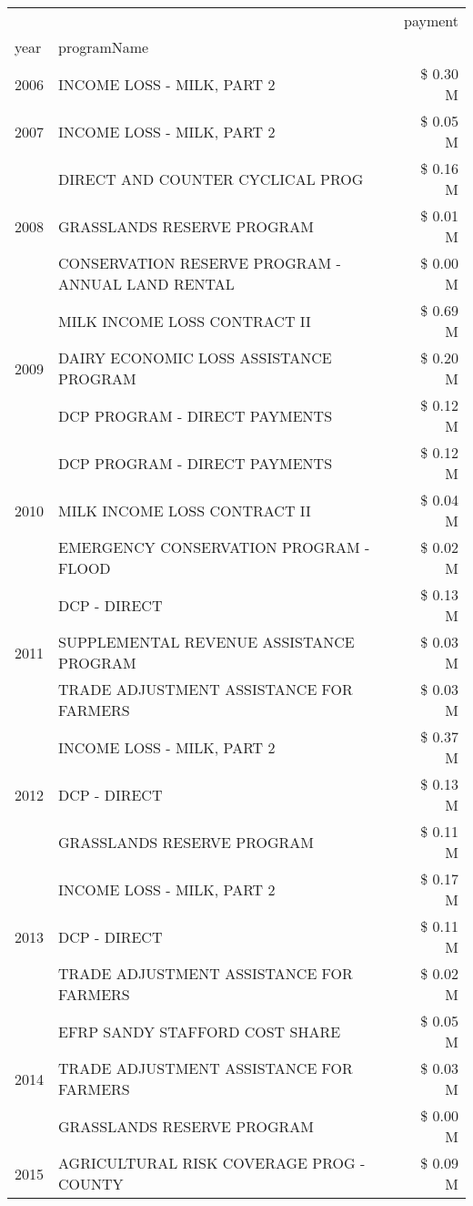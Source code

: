 \begin{tabular}{llr}
\toprule
 &  & payment \\
year & programName &  \\
\midrule
2006 & INCOME LOSS - MILK, PART 2 & \$ 0.30 M \\
\cline{1-3}
2007 & INCOME LOSS - MILK, PART 2 & \$ 0.05 M \\
\cline{1-3}
\multirow[t]{3}{*}{2008} & DIRECT AND COUNTER CYCLICAL PROG & \$ 0.16 M \\
 & GRASSLANDS RESERVE PROGRAM & \$ 0.01 M \\
 & CONSERVATION RESERVE PROGRAM - ANNUAL LAND RENTAL & \$ 0.00 M \\
\cline{1-3}
\multirow[t]{3}{*}{2009} & MILK INCOME LOSS CONTRACT II & \$ 0.69 M \\
 & DAIRY ECONOMIC LOSS ASSISTANCE PROGRAM & \$ 0.20 M \\
 & DCP PROGRAM - DIRECT PAYMENTS & \$ 0.12 M \\
\cline{1-3}
\multirow[t]{3}{*}{2010} & DCP PROGRAM - DIRECT PAYMENTS & \$ 0.12 M \\
 & MILK INCOME LOSS CONTRACT II & \$ 0.04 M \\
 & EMERGENCY CONSERVATION PROGRAM - FLOOD & \$ 0.02 M \\
\cline{1-3}
\multirow[t]{3}{*}{2011} & DCP - DIRECT & \$ 0.13 M \\
 & SUPPLEMENTAL REVENUE ASSISTANCE PROGRAM & \$ 0.03 M \\
 & TRADE ADJUSTMENT ASSISTANCE FOR FARMERS & \$ 0.03 M \\
\cline{1-3}
\multirow[t]{3}{*}{2012} & INCOME LOSS - MILK, PART 2 & \$ 0.37 M \\
 & DCP - DIRECT & \$ 0.13 M \\
 & GRASSLANDS RESERVE PROGRAM & \$ 0.11 M \\
\cline{1-3}
\multirow[t]{3}{*}{2013} & INCOME LOSS - MILK, PART 2 & \$ 0.17 M \\
 & DCP - DIRECT & \$ 0.11 M \\
 & TRADE ADJUSTMENT ASSISTANCE FOR FARMERS & \$ 0.02 M \\
\cline{1-3}
\multirow[t]{3}{*}{2014} & EFRP SANDY STAFFORD COST SHARE & \$ 0.05 M \\
 & TRADE ADJUSTMENT ASSISTANCE FOR FARMERS & \$ 0.03 M \\
 & GRASSLANDS RESERVE PROGRAM & \$ 0.00 M \\
\cline{1-3}
\multirow[t]{3}{*}{2015} & AGRICULTURAL RISK COVERAGE PROG - COUNTY & \$ 0.09 M \\

\end{tabular}
